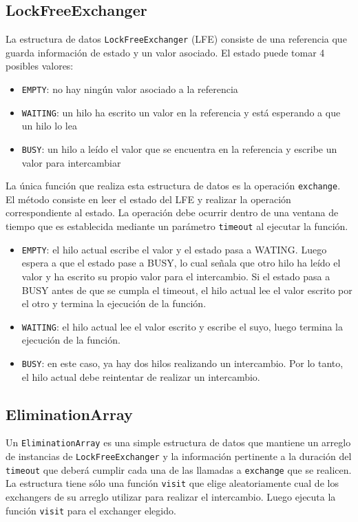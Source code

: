 \subsection{LockFreeExchanger}
La estructura de datos \texttt{LockFreeExchanger} (LFE) consiste de una referencia que guarda información de estado y un valor asociado. El estado puede tomar 4 posibles valores:

\begin{itemize}
\item{\texttt{EMPTY}: no hay ningún valor asociado a la referencia}
\item{\texttt{WAITING}: un hilo ha escrito un valor en la referencia y está esperando a que un hilo lo lea}
\item{\texttt{BUSY}: un hilo a leído el valor que se encuentra en la referencia y escribe un valor para intercambiar}
\end{itemize}

La única función que realiza esta estructura de datos es la operación \texttt{exchange}. El método consiste en leer el estado del LFE y realizar la operación correspondiente al estado. La operación debe ocurrir dentro de una ventana de tiempo que es establecida mediante un parámetro \texttt{timeout} al ejecutar la función.

\begin{itemize}
\item{\texttt{EMPTY}: el hilo actual escribe el valor y el estado pasa a WATING. Luego espera a que el estado pase a BUSY, lo cual señala que otro hilo ha leído el valor y ha escrito su propio valor para el intercambio. Si el estado pasa a BUSY antes de que se cumpla el timeout, el hilo actual lee el valor escrito por el otro y termina la ejecución de la función.}
\item{\texttt{WAITING}: el hilo actual lee el valor escrito y escribe el suyo, luego termina la ejecución de la función.}
\item{\texttt{BUSY}: en este caso, ya hay dos hilos realizando un intercambio. Por lo tanto, el hilo actual debe reintentar de realizar un intercambio.}
\end{itemize}

\subsection{EliminationArray}
Un \texttt{EliminationArray} es una simple estructura de datos que mantiene un arreglo de instancias de \texttt{LockFreeExchanger} y la información pertinente a la duración del \texttt{timeout} que deberá cumplir cada una de las llamadas a \texttt{exchange} que se realicen.
La estructura tiene sólo una función \texttt{visit} que elige aleatoriamente cual de los exchangers de su arreglo utilizar para realizar el intercambio. Luego ejecuta la función \texttt{visit} para el exchanger elegido.

